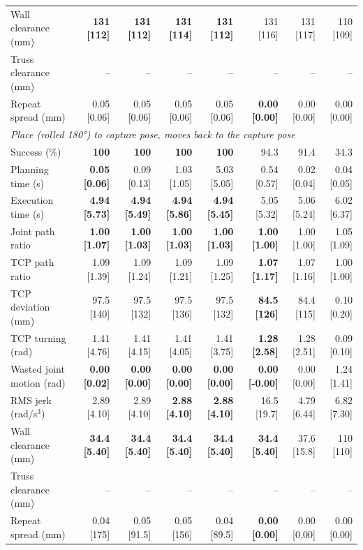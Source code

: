 \begin{table}[t]
\begin{tabular}{lrrrrrrr}
Wall clearance (mm) & \textbf{131 [112]} & \textbf{131 [112]} & \textbf{131 [114]} & \textbf{131 [112]} & 131 [116] & 131 [117] & 110 [109] \\
Truss clearance (mm) & -- & -- & -- & -- & -- & -- & -- \\
Repeat spread (mm) & 0.05 [0.06] & 0.05 [0.06] & 0.05 [0.06] & 0.05 [0.06] & \textbf{0.00 [0.00]} & 0.00 [0.00] & 0.00 [0.00] \\
\midrule
\multicolumn{8}{l}{\emph{Place (rolled 180°) to capture pose, moves back to the capture pose}} \\
Success (\%) & \textbf{100} & \textbf{100} & \textbf{100} & \textbf{100} & 94.3 & 91.4 & 34.3 \\
Planning time (s) & \textbf{0.05 [0.06]} & 0.09 [0.13] & 1.03 [1.05] & 5.03 [5.05] & 0.54 [0.57] & 0.02 [0.04] & 0.04 [0.05] \\
Execution time (s) & \textbf{4.94 [5.73]} & \textbf{4.94 [5.49]} & \textbf{4.94 [5.86]} & \textbf{4.94 [5.45]} & 5.05 [5.32] & 5.06 [5.24] & 6.02 [6.37] \\
Joint path ratio & \textbf{1.00 [1.07]} & \textbf{1.00 [1.03]} & \textbf{1.00 [1.03]} & \textbf{1.00 [1.03]} & \textbf{1.00 [1.00]} & 1.00 [1.00] & 1.05 [1.09] \\
TCP path ratio & 1.09 [1.39] & 1.09 [1.24] & 1.09 [1.21] & 1.09 [1.25] & \textbf{1.07 [1.17]} & 1.07 [1.16] & 1.00 [1.00] \\
TCP deviation (mm) & 97.5 [140] & 97.5 [132] & 97.5 [136] & 97.5 [132] & \textbf{84.5 [126]} & 84.4 [115] & 0.10 [0.20] \\
TCP turning (rad) & 1.41 [4.76] & 1.41 [4.15] & 1.41 [4.05] & 1.41 [3.75] & \textbf{1.28 [2.58]} & 1.28 [2.51] & 0.09 [0.10] \\
Wasted joint motion (rad) & \textbf{0.00 [0.02]} & \textbf{0.00 [0.00]} & \textbf{0.00 [0.00]} & \textbf{0.00 [0.00]} & \textbf{0.00 [-0.00]} & 0.00 [0.00] & 1.24 [1.41] \\
RMS jerk (rad/s$^3$) & 2.89 [4.10] & 2.89 [4.10] & \textbf{2.88 [4.10]} & \textbf{2.88 [4.10]} & 16.5 [19.7] & 4.79 [6.44] & 6.82 [7.30] \\
Wall clearance (mm) & \textbf{34.4 [5.40]} & \textbf{34.4 [5.40]} & \textbf{34.4 [5.40]} & \textbf{34.4 [5.40]} & \textbf{34.4 [5.40]} & 37.6 [15.8] & 110 [110] \\
Truss clearance (mm) & -- & -- & -- & -- & -- & -- & -- \\
Repeat spread (mm) & 0.04 [175] & 0.05 [91.5] & 0.05 [156] & 0.04 [89.5] & \textbf{0.00 [0.00]} & 0.00 [0.00] & 0.00 [0.00] \\
\bottomrule
\end{tabular}
\end{table}
